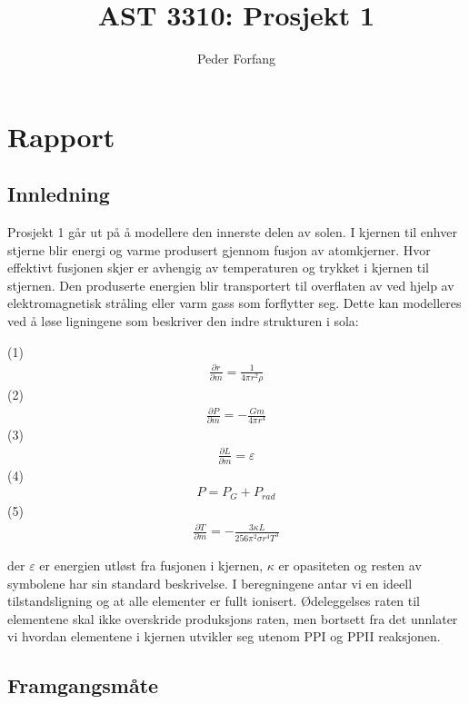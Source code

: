 \documentclass[norsk,a4paper,12pt]{article}
\begin{document}
\title{AST 3310: Prosjekt 1}
\author{Peder Forfang}
\maketitle


\section{Rapport}

\subsection{Innledning}

Prosjekt 1 går ut på å modellere den innerste delen av solen. I kjernen til enhver stjerne blir energi og varme 
produsert gjennom fusjon av atomkjerner. Hvor effektivt fusjonen skjer er avhengig av temperaturen og trykket i 
kjernen til stjernen. Den produserte energien blir transportert til overflaten av ved hjelp av elektromagnetisk
 stråling eller varm gass som forflytter seg. Dette kan modelleres ved å løse ligningene 
som beskriver den indre strukturen i sola: 

(1)
\begin{align*}
 \frac{\partial r}{\partial m} = \frac{1}{4\pi r^2\rho}
\end{align*}
(2) 
\begin{align*}
\frac{\partial P}{\partial m} = -\frac{Gm}{4\pi r^4}
\end{align*}
(3)
\begin{align*}
 \frac{\partial L}{\partial m} = \varepsilon
\end{align*}
(4)
\begin{align*}
 P = P_G + P_{rad}
\end{align*}
(5) 
\begin{align*}
\frac{\partial T}{\partial m} = -\frac{3\kappa L}{256\pi^2\sigma r^4T^3}
\end{align*}

der $\varepsilon $ er energien utløst fra fusjonen i kjernen, $\kappa $ er opasiteten
og resten av symbolene har sin standard beskrivelse. I 
beregningene antar vi en ideell tilstandsligning og at alle elementer er fullt ionisert. 
Ødeleggelses raten til elementene skal ikke overskride produksjons raten,
 men bortsett fra det unnlater vi hvordan elementene i kjernen utvikler seg utenom PPI og PPII reaksjonen.

\subsection{Framgangsmåte}
\end{document}
